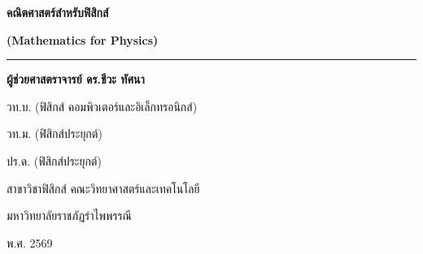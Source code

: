\begin{titlepage}
    \centering
    \vspace*{1.5cm}
    
    {\Huge\bfseries\color{rbruNavy} คณิตศาสตร์สำหรับฟิสิกส์ \par}
    \vspace{0.5cm}
    {\Large\bfseries\color{rbruGreen} (Mathematics for Physics) \par}
    
    \vspace{1.5cm}
    \rule{0.8\textwidth}{1.5pt}
    \vspace{1.5cm}
    
    {\Large\textbf{ผู้ช่วยศาสตราจารย์ ดร.ชีวะ ทัศนา}\par}
    \vspace{0.35cm}
    {\large วท.บ. (ฟิสิกส์ คอมพิวเตอร์และอิเล็กทรอนิกส์)\par}
    \vspace{0.1cm}
    {\large วท.ม. (ฟิสิกส์ประยุกต์)\par}
    \vspace{0.1cm}
    {\large ปร.ด. (ฟิสิกส์ประยุกต์)\par}
    
    \vfill
    
    {\large สาขาวิชาฟิสิกส์ คณะวิทยาศาสตร์และเทคโนโลยี\par}
    \vspace{0.2cm}
    {\large มหาวิทยาลัยราชภัฏรำไพพรรณี\par}
    \vspace{0.5cm}
    {\large พ.ศ. 2569\par}
\end{titlepage}
